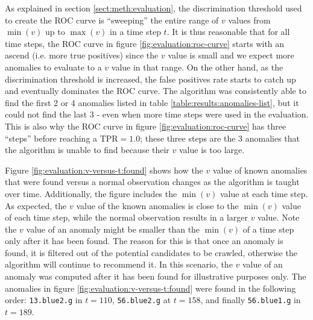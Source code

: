 As explained in section \ref{sect:meth:evaluation}, the discrimination threshold used to create the ROC curve is ``sweeping'' the entire range of $v$ values from $\min(v)$ up to $\max(v)$ in a time step $t$. It is thus reasonable that for all time steps, the ROC curve in figure \ref{fig:evaluation:roc-curve} starts with an ascend (i.e. more true positives) since the $v$ value is small and we expect more anomalies to evaluate to a $v$ value in that range. On the other hand, as the discrimination threshold is increased, the false positives rate starts to catch up and eventually dominates the ROC curve. The \mlblink algorithm was consistently able to find the first 2 or 4 anomalies listed in table \ref{table:results:anomalies-list}, but it could not find the last 3 - even when more time steps were used in the evaluation. This is also why the ROC curve in figure \ref{fig:evaluation:roc-curve} has three ``steps'' before reaching a $\text{TPR} = 1.0$; these three steps are the 3 anomalies that the \mlblink algorithm is unable to find because their $v$ value is too large. \newline

Figure \ref{fig:evaluation:v-versus-t:found} shows how the $v$ value of known anomalies that were found versus a normal observation changes as the \mlblink algorithm is taught over time. Additionally, the figure includes the $\min(v)$ value at each time step. As expected, the $v$ value of the known anomalies is close to the $\min(v)$ value of each time step, while the normal observation results in a larger $v$ value. Note the $v$ value of an anomaly might be smaller than the $\min(v)$ of a time step only after it has been found. The reason for this is that once an anomaly is found, it is filtered out of the potential candidates to be crawled, otherwise the \mlblink algorithm will continue to recommend it. In this scenario, the $v$ value of an anomaly was computed after it has been found for illustrative purposes only. The anomalies in figure \ref{fig:evaluation:v-versus-t:found} were found in the following order: \texttt{13.blue2.g} in $t = 110$, \texttt{56.blue2.g} at $t = 158$, and finally \texttt{56.blue1.g} in $t = 189$. \newline


